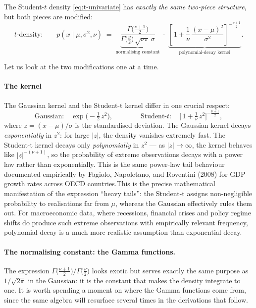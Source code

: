 \documentclass[11pt, a4paper, oneside]{article}
\begin{document}
The Student-$t$ density \eqref{eq:t-univariate} has \emph{exactly the same
two-piece structure}, but both pieces are modified:
\[
t\text{-density:} \qquad
p(x \mid \mu, \sigma^2, \nu) \;=\;
\underbrace{\frac{\Gamma\!\big(\tfrac{\nu+1}{2}\big)}{\Gamma\!\big(\tfrac{\nu}{2}\big)\,\sqrt{\nu\pi}\,\sigma}}_{\text{normalising constant}}
\;\cdot\;
\underbrace{\left[\,1 + \frac{1}{\nu}\,\frac{(x-\mu)^2}{\sigma^2}\right]^{-\frac{\nu+1}{2}}}_{\text{polynomial-decay kernel}}.
\]

Let us look at the two modifications one at a time.

\paragraph{The kernel}
The Gaussian kernel and the Student-t kernel differ in one crucial respect:
\[
\text{Gaussian:} \quad \exp\!\Big(-\tfrac{1}{2}\,z^2\Big),
\qquad\qquad
\text{Student-}t: \quad \big[\,1 + \tfrac{1}{\nu}\,z^2\big]^{-\tfrac{\nu+1}{2}},
\]
where $z = (x - \mu)/\sigma$ is the standardised deviation. The Gaussian
kernel decays \emph{exponentially} in $z^2$: for large $|z|$, the density
vanishes extremely fast. The Student-t kernel decays only \emph{polynomially}
in $z^2$ — as $|z| \to \infty$, the kernel behaves like $|z|^{-(\nu+1)}$, so
the probability of extreme observations decays with a power law rather than
exponentially.
This is the same power-law tail behaviour documented empirically by Fagiolo, Napoletano, and Roventini (2008) 
for GDP growth rates across OECD countries.This is the precise mathematical manifestation of the expression ``heavy
tails'': the Student-t assigns non-negligible probability to realisations
far from $\mu$, whereas the Gaussian effectively rules them out. For
macroeconomic data, where recessions, financial crises and policy regime
shifts do produce such extreme observations with empirically relevant
frequency, polynomial decay is a much more realistic assumption than
exponential decay.

\paragraph{The normalising constant: the Gamma functions.}
The expression $\Gamma\!\big(\tfrac{\nu+1}{2}\big) / \Gamma\!\big(\tfrac{\nu}{2}\big)$
looks exotic but serves exactly the same purpose as $1/\sqrt{2\pi}$ in the
Gaussian: it is the constant that makes the density integrate to one. It is
worth spending a moment on where the Gamma functions come from, since the
same algebra will resurface several times in the derivations that follow.
\end{document}
